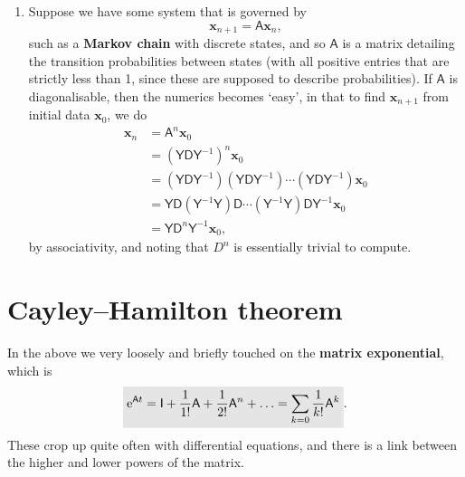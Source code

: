 \documentclass[letter-paper]{tufte-book}
\newenvironment{example}[1][Example]{\begin{trivlist}
\item[\hskip \labelsep {\bfseries #1}]}{\end{trivlist}}
\newcommand{\As}{{\mathsf{A}}}
\newcommand{\Ds}{{\mathsf{D}}}
\newcommand{\Is}{{\mathsf{I}}}
\newcommand{\Ys}{{\mathsf{Y}}}
\newcommand{\xb}{{\boldsymbol{x}}}
\newcommand{\highlight}[1]{\mathchoice%
  {\colorbox{black!10}{$\displaystyle#1$}}%
  {\colorbox{black!10}{$\textstyle#1$}}%
  {\colorbox{black!10}{$\scriptstyle#1$}}%
  {\colorbox{black!10}{$\scriptscriptstyle#1$}}}%
\begin{document}
\begin{example}
\begin{enumerate}
    \item Suppose we have some system that is governed by
    \begin{equation*}
      \xb_{n+1} = \As\xb_n,
    \end{equation*}
    such as a \textbf{Markov chain} with discrete states, and so $\As$ is a matrix detailing the transition probabilities between states (with all positive entries that are strictly less than 1, since these are supposed to describe probabilities). If $\As$ is diagonalisable, then the numerics becomes `easy', in that to find $\xb_{n+1}$ from initial data $\xb_0$, we do
    \begin{align*}
      \xb_n &= \As^n\xb_0 \\ 
        &= (\Ys \Ds \Ys^{-1})^n \xb_0 \\
        &= (\Ys \Ds \Ys^{-1})(\Ys \Ds \Ys^{-1})\cdots(\Ys \Ds \Ys^{-1}) \xb_0 \\
        &= \Ys \Ds (\Ys^{-1}\Ys)\Ds\cdots(\Ys^{-1}\Ys)\Ds\Ys^{-1} \xb_0 \\
        &= \Ys \Ds^n \Ys^{-1} \xb_0,
    \end{align*}
    by associativity, and noting that $D^n$ is essentially trivial to compute.
  \end{enumerate}
\end{example}


\section{Cayley--Hamilton theorem}

In the above we very loosely and briefly touched on the \textbf{matrix exponential}, which is
\begin{equation}
  \highlight{\mathrm{e}^{\As t} = \Is + \frac{1}{1!}\As + \frac{1}{2!}\As^n + \ldots = \sum_{k=0}\frac{1}{k!}\As^k}.
\end{equation}
These crop up quite often with differential equations, and there is a link between the higher and lower powers of the matrix.
\end{document}
